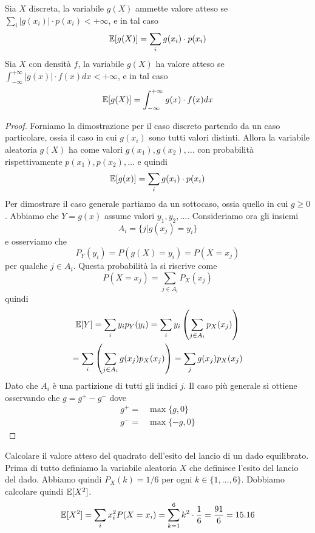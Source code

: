 \begin{proposition}
	Sia $X$ discreta, la variabile $g(X)$ ammette valore atteso se
	$\sum_i |g(x_i)| \cdot p(x_i) < +\infty$, e in tal caso
	\[ \mathbb{E}[g(X)] = \sum_i g(x_i) \cdot p(x_i) \]
	Sia $X$ con densità $f$, la variabile $g(X)$ ha valore atteso se
	$\int_{-\infty}^{+\infty} |g(x)| \cdot f(x) dx < +\infty$, e in tal caso
	\[ \mathbb{E}[g(X)] = \int_{-\infty}^{+\infty} g(x) \cdot f(x) dx \]
	\begin{proof}
		Forniamo la dimostrazione per il caso discreto partendo da un caso particolare, ossia il
		caso in cui $g(x_i)$ sono tutti valori distinti. Allora la variabile aleatoria $g(X)$ ha
		come valori $g(x_1), g(x_2), \dots$ con probabilità rispettivamente $p(x_1), p(x_2), \dots$
		e quindi
		\[ \mathbb{E}[g(x)] = \sum_i g(x_i) \cdot p(x_i) \]
		Per dimostrare il caso generale partiamo da un sottocaso, ossia quello in cui $g \geq 0$.
		Abbiamo che $Y = g(x)$ assume valori $y_1, y_2, \dots$. Consideriamo ora gli insiemi
		\[ A_i = \{ j | g(x_j) = y_i \} \]
		e osserviamo che
		\[ P_Y(y_i) = P(g(X) = y_i) = P(X = x_j) \]
		per qualche $j \in A_i$. Questa probabilità la si riscrive come
		\[ P(X = x_j) = \sum_{j \in A_i} P_X (x_j) \]
		quindi
		\begin{multline*}
			\mathbb{E}[Y] = \sum_i y_i p_Y(y_i) = \sum_i y_i \left( \sum_{j \in A_i} p_X(x_j) \right) \\
			= \sum_i \left( \sum_{j \in A_i} g(x_j) p_X (x_j) \right) = \sum_j g(x_j) p_X (x_j)
		\end{multline*}
		Dato che $A_i$ è una partizione di tutti gli indici $j$. Il caso più generale si ottiene
		osservando che $g = g^+ - g^-$ dove
		\begin{align*}
			g^+ = & \max \{g,0\} \\
			g^- = & \max\{-g,0\}
		\end{align*}
	\end{proof}
\end{proposition}

\begin{example}
	Calcolare il valore atteso del quadrato dell'esito del lancio di un dado equilibrato. Prima di
	tutto definiamo la variabile aleatoria $X$ che definisce l'esito del lancio del dado. Abbiamo
	quindi $P_X(k) = 1/6$ per ogni $k \in \{1, \dots, 6\}$. Dobbiamo calcolare quindi $\mathbb{E}[X^2]$.
	\[
		\mathbb{E}[X^2] = \sum_i x_i^2 P(X = x_i) = \sum_{k=1}^6 k^2 \cdot \frac{1}{6}
		= \frac{91}{6} = 15.16
	\]
\end{example}

